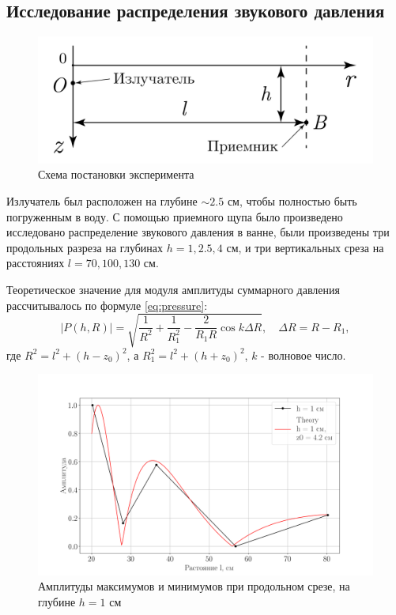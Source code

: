 \subsection{Исследование распределения звукового давления}
\begin{figure}[h!]
	\centering
	\includegraphics[width =0.6\linewidth]{fig/scheme3.pdf}
	\caption{Схема постановки эксперимента}
	\label{fig:expt:scheme3}
\end{figure}
Излучатель был расположен на глубине $\sim 2.5$ см, чтобы полностью быть погруженным в воду.
С помощью приемного щупа было произведено исследовано распределение звукового давления в ванне, были произведены три
продольных разреза на глубинах $h = 1,2.5,4$ см, и три вертикальных среза на расстояниях $l=70,100,130$ см.

Теоретическое значение для модуля амплитуды суммарного давления рассчитывалось по формуле \eqref{eq:pressure}:
\begin{equation}
	|P(h,R)| = \sqrt{ \frac{1}{R^2} + \frac{1}{R_1^2} - \frac{2}{R_1 R} \cos k \Delta R },\quad \Delta R = R-R_1,
	\label{eq:pressure}
\end{equation}
где $R^2 = l^2+(h-z_0)^2$, а $R_1^2 = l^2 + (h+z_0)^2$, $k$ - волновое число.

\begin{figure}[h!]
	\centering
	\includegraphics[width =0.75\linewidth]{fig/task21}
	\caption{Амплитуды максимумов и минимумов при продольном срезе, на глубине $h=1$ см}
	\label{fig:task21}
\end{figure}

